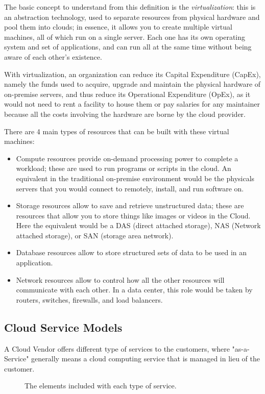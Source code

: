 The basic concept to understand from this definition is the \emph{virtualization}: this is an abstraction technology, used to separate resources from physical hardware and pool them into clouds; in essence, it allows you to create multiple virtual machines, all of which run on a single server. Each one has its own operating system and set of applications, and can run all at the same time without being aware of each other's existence.

With virtualization, an organization can reduce its Capital Expenditure (CapEx), namely the funds used to acquire, upgrade and maintain the physical hardware of on-premise servers, and thus reduce its Operational Expenditure (OpEx), as it would not need to rent a facility to house them or pay salaries for any maintainer because all the costs involving the hardware are borne by the cloud provider. 

There are 4 main types of resources that can be built with these virtual machines:
\begin{itemize}
    \item Compute resources provide on-demand processing power to complete a workload; these are used to run programs or scripts in the cloud. An equivalent in the traditional on-premise environment would be the physicals servers that you would connect to remotely, install, and run software on.
    \item Storage resources allow to save and retrieve unstructured data; these are resources that allow you to store things like images or videos in the Cloud. Here the equivalent would be a DAS (direct attached storage), NAS (Network attached storage), or SAN (storage area network).
    \item Database resources allow to store structured sets of data to be used in an application.
    \item Network resources allow to control how all the other resources will communicate with each other. In a data center, this role would be taken by routers, switches, firewalls, and load balancers.
\end{itemize}

\subsection{Cloud Service Models}
A Cloud Vendor offers different type of services to the customers, where "as-a-Service" generally means a cloud computing service that is managed in lieu of the customer.
\begin{figure}[!htb]
    \centering
    
    \caption{The elements included with each type of service. \cite{model}}
    \label{fig:cloud_service_models}
\end{figure}

